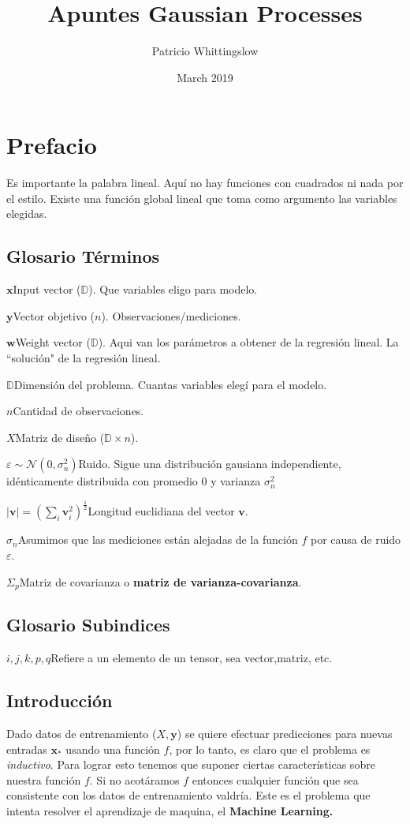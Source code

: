 \documentclass{article}
\title{Apuntes Gaussian Processes}
\author{Patricio Whittingslow}
\date{March 2019}
\newcommand{\glossentry}[2]{$#1$\indent #2 \par \vspace{.4cm} } %
\newcommand{\vectorbold}[1]{\mathbf{#1}}
\newcommand{\Dim}{\mathbb{D}}
\newcommand{\func}{f}
\newcommand{\noise}{\varepsilon}
\newcommand{\GD}{\mathcal{N}}
\newcommand{\sn}{\sigma_{n}}
\newcommand{\xbold}{\vectorbold{x}}
\newcommand{\ybold}{\vectorbold{y}}
\newcommand{\vbold}{\vectorbold{v}}
\newcommand{\pbold}{\vectorbold{p}}
\newcommand{\qbold}{\vectorbold{q}}
\begin{document}
\maketitle

\section{Prefacio}

Es importante la palabra lineal. Aquí no hay funciones con cuadrados ni nada por el estilo. Existe una función global lineal que toma como argumento las variables elegidas.
\subsection*{Glosario Términos}

\glossentry{\vectorbold{x}}{Input vector ($\Dim$). Que variables eligo para modelo.}

\glossentry{\vectorbold{y}}{Vector objetivo ($n$). Observaciones/mediciones.}
\glossentry{\vectorbold{w}}{Weight vector ($\Dim$). Aqui van los parámetros a obtener de la regresión lineal. La ``solución" de la regresión lineal.}
\glossentry{\Dim}{Dimensión del problema. Cuantas variables elegí para el modelo.}
\glossentry{n}{Cantidad de observaciones.}
\glossentry{X}{Matriz de diseño ($\Dim \times n$). }
\glossentry{\noise\sim \GD (0,\sn^2) }{Ruido. Sigue una distribución gausiana independiente, idénticamente distribuida con promedio $0$ y varianza $\sn^2$}
\glossentry{|\vbold|=\left(\sum_i\vbold_i^2\right)^\frac{1}{2}}{Longitud euclidiana del vector $\vbold$. }
\glossentry{\sn}{Asumimos que las mediciones están alejadas de la función $\func$ por causa de ruido $\noise$.}

\glossentry{\Sigma_p}{Matriz de covarianza o \textbf{matriz de varianza-covarianza}.}
\subsection*{Glosario Subindices}
\glossentry{i,j,k,p,q}{Refiere a un elemento de un tensor, sea vector,matriz, etc.}
\subsection{Introducción}

Dado datos de entrenamiento ($X,\ybold$) se quiere efectuar predicciones para nuevas entradas $\xbold_*$ usando una función $\func$, por lo tanto, es claro que el problema es \textit{inductivo}. Para lograr esto tenemos que suponer ciertas características sobre nuestra función $\func$. Si no acotáramos $\func$ entonces cualquier función que sea consistente con los datos de entrenamiento valdría. Este es el problema que intenta resolver el aprendizaje de maquina, el \textbf{Machine Learning.}
\end{document}
